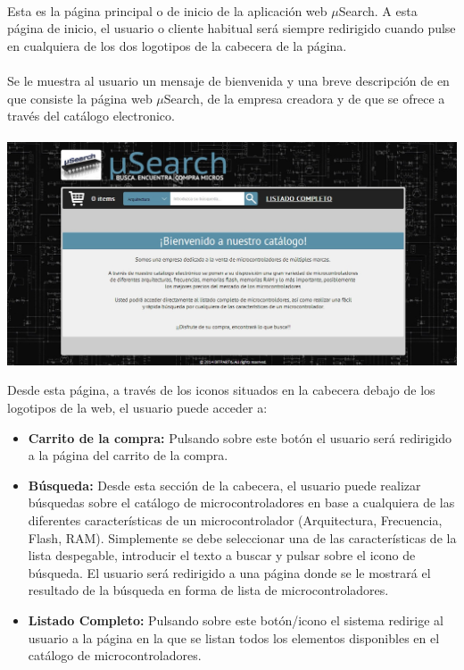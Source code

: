 \paragraph{}Esta es la página principal o de inicio de la aplicación web $\mu$Search. A esta página de inicio, el usuario o cliente habitual será siempre redirigido cuando pulse en cualquiera de los dos logotipos de la cabecera de la página.

\paragraph{}Se le muestra al usuario un mensaje de bienvenida y una breve descripción de en que consiste la página web $\mu$Search, de la empresa creadora y de que se ofrece a través del catálogo electronico.

\begin{center}
	\paragraph{}\includegraphics[scale=0.35]{img/principal_user}\singlelinebreak
\end{center}

Desde esta página, a través de los iconos situados en la cabecera debajo de los logotipos de la web, el usuario puede acceder a:
\begin{itemize}
	\item\textbf{Carrito de la compra:} Pulsando sobre este botón el usuario será redirigido a la página del carrito de la compra.
	
	\item \textbf{Búsqueda:} Desde esta sección de la cabecera, el usuario puede realizar búsquedas sobre el catálogo de microcontroladores en base a cualquiera de las diferentes características de un microcontrolador (Arquitectura, Frecuencia, Flash, RAM). Simplemente se debe seleccionar una de las características de la lista despegable, introducir el texto a buscar y pulsar sobre el icono de búsqueda.
	El usuario será redirigido a una página donde se le mostrará el resultado de la búsqueda en forma de lista de microcontroladores.
	
	\item \textbf{Listado Completo:} Pulsando sobre este botón/icono el sistema redirige al usuario a la página en la que se listan todos los elementos disponibles en el catálogo de microcontroladores.
	
\end{itemize}